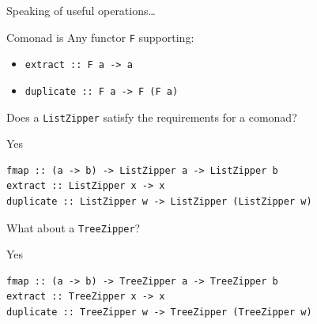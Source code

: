 \begin{frame}
\begin{center}
Speaking of useful operations\ldots
\end{center}
\end{frame}

\begin{frame}
\begin{block}{Comonad is}
Any functor \lstinline{F} supporting:
\begin{center}
\begin{itemize}
  \item \lstinline{extract :: F a -> a}
  \item \lstinline{duplicate :: F a -> F (F a)}
\end{itemize}
\end{center}
\end{block}
\end{frame}

\begin{frame}
\begin{center}
Does a \lstinline{ListZipper} satisfy the requirements for a comonad?
\end{center}
\end{frame}

\begin{frame}[fragile]
\begin{block}{Yes}
\begin{center}
\begin{lstlisting}[style=haskell]
fmap :: (a -> b) -> ListZipper a -> ListZipper b
extract :: ListZipper x -> x
duplicate :: ListZipper w -> ListZipper (ListZipper w)
\end{lstlisting}
\end{center}
\end{block}
\end{frame}

\begin{frame}
\begin{center}
What about a \lstinline{TreeZipper}?
\end{center}
\end{frame}

\begin{frame}[fragile]
\begin{block}{Yes}
\begin{center}
\begin{lstlisting}[style=haskell]
fmap :: (a -> b) -> TreeZipper a -> TreeZipper b
extract :: TreeZipper x -> x
duplicate :: TreeZipper w -> TreeZipper (TreeZipper w)
\end{lstlisting}
\end{center}
\end{block}
\end{frame}

